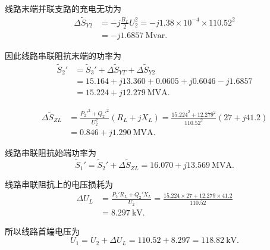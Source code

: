 \begin{enumerate}
\begin{solution}
              线路末端并联支路的充电无功为
              \begin{align*}
                  \Delta \tilde S_{Y2}
                   & =-j\frac{B_L}{2}U_2^2
                  =-j1.38\times10^{-4}\times110.52^2                      \\
                   & =\boxed{-j1.6857\ \mathrm{Mvar}}.
              \end{align*}

              因此线路串联阻抗末端的功率为
              \begin{align*}
                  \tilde S_2'
                   & =\tilde S_3'+\Delta \tilde S_{YT}
                  +\Delta \tilde S_{Y2}                                    \\
                   & =15.164+j13.360+0.0605+j0.6046-j1.6857                  \\
                   & =\boxed{15.224+j12.279\ \mathrm{MVA}}.
              \end{align*}


              \begin{align*}
                  \Delta \tilde S_{ZL}
                   & =\frac{P_2'^2+Q_2'^2}{U_2^2}(R_L+jX_L)
                  =\frac{15.224^2+12.279^2}{110.52^2}(27+j41.2)           \\
                   & =\boxed{0.846+j1.290\ \mathrm{MVA}}.
              \end{align*}

              线路串联阻抗始端功率为
              \begin{equation*}
                  \tilde S_1'=\tilde S_2'+\Delta \tilde S_{ZL}
                  =16.070+j13.569\ \mathrm{MVA}.
              \end{equation*}

              线路串联阻抗上的电压损耗为
              \begin{align*}
                  \Delta U_L
                   & =\frac{P_2'R_L+Q_2'X_L}{U_2}
                  =\frac{15.224\times27+12.279\times41.2}{110.52}          \\
                   & =8.297\ \mathrm{kV}.
              \end{align*}

              所以线路首端电压为
              \begin{equation*}
                  U_1=U_2+\Delta U_L
                  =110.52+8.297
                  =\boxed{118.82\ \mathrm{kV}}.
              \end{equation*}


\end{solution}
\end{enumerate}
